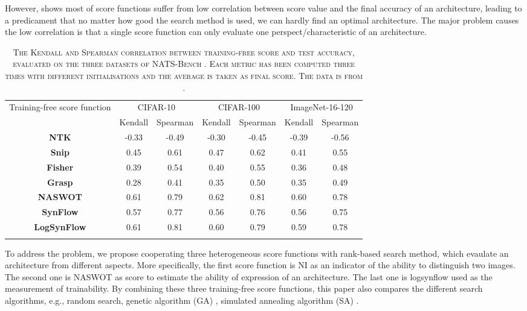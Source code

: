 \documentclass[sigconf]{acmart}
\begin{document}
    However,  shows most of score functions suffer from low correlation between 
    score value and the final accuracy of an architecture, leading to a predicament 
    that no matter how good the search method is used, we can hardly find 
    an optimal architecture. 
    The major problem causes the low correlation is that a single score 
    function can only evaluate one perspect/characteristic of an architecture. 
    \begin{table*}[htb]
        \caption{\textsc{The Kendall and Spearman correlation between training-free score and test accuracy, evaluated on the three datasets of NATS-Bench \cite{Dong_2021}. 
        Each metric has been computed three times with different initialisations and the average is taken as final score. The data is from \cite{Cavagnero_2023}.}}
        \begin{tabular}{ccccccc}\toprule
            Training-free score function & \multicolumn{2}{c}{CIFAR-10} & \multicolumn{2}{c}{CIFAR-100} & \multicolumn{2}{c}{ImageNet-16-120} \\ 
            \cmidrule(lr){2-3}\cmidrule(lr){4-5}\cmidrule(lr){6-7} & Kendall & Spearman & Kendall & Spearman & Kendall & Spearman \\ \midrule
            \bf{NTK} & -0.33 & -0.49 & -0.30 & -0.45 & -0.39 & -0.56 \\
            \bf{Snip} & 0.45 & 0.61 & 0.47 & 0.62 & 0.41 & 0.55 \\
            \bf{Fisher} & 0.39 & 0.54 & 0.40 & 0.55 & 0.36 & 0.48 \\
            \bf{Grasp} & 0.28 & 0.41 & 0.35 & 0.50 & 0.35 & 0.49 \\
            \bf{NASWOT} & 0.61 & 0.79 & 0.62 & 0.81 & 0.60 & 0.78 \\
            \bf{SynFlow} & 0.57 & 0.77 & 0.56 & 0.76 & 0.56 & 0.75 \\
            \bf{LogSynFlow} & 0.61 & 0.81 & 0.60 & 0.79 & 0.59 & 0.78 \\ \bottomrule
            \label{table:corr_score}
          \vspace{-\baselineskip}
        \end{tabular}
    \end{table*}
    
    To address the problem, we propose cooperating three heterogeneous score 
    functions with rank-based search method, which evaulate an architecture 
    from different aspects. More specifically, the first score function is 
    NI \cite{10092788} as an indicator of the ability to distinguish two images. 
    The second one is NASWOT as score to estimate the ability of expression 
    of an architecture. The last one is logsynflow used as the measurement of 
    trainability. 
    By combining these three training-free score functions, this paper also 
    compares the different search algorithms, e.g., random search, genetic 
    algorithm (GA) \cite{mitchell1998introduction}, simulated annealing algorithm (SA)
    \cite{kirkpatrick1983optimization}. 
\end{document}
